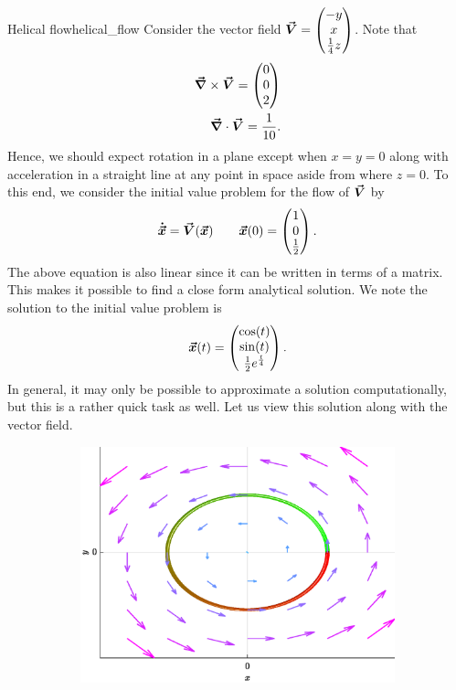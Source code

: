         \begin{ex}{Helical flow}{helical_flow}
        Consider the vector field $\boldsymbol{\vec{V}}=\begin{pmatrix} -y \\ x \\ \frac{1}{4}z \end{pmatrix}$. Note that
    \begin{align}
    \boldsymbol{\vec{\nabla}} \times \boldsymbol{\vec{V}} = \begin{pmatrix} 0 \\ 0 \\ 2 \end{pmatrix}\\
    \boldsymbol{\vec{\nabla}} \cdot \boldsymbol{\vec{V}} = \frac{1}{10}.
    \end{align}
    Hence, we should expect rotation in a plane except when $x=y=0$ along with acceleration in a straight line at any point in space aside from where $z=0$. To this end, we consider the initial value problem for the flow of $\boldsymbol{\vec{V}}$ by
    \begin{equation}
    \boldsymbol{\dot{\vec{x}}} = \boldsymbol{\vec{V}}(\boldsymbol{\vec{x}}) \qquad \boldsymbol{\vec{x}}(0)=\begin{pmatrix} 1 \\ 0 \\ \frac{1}{2} \end{pmatrix}.
    \end{equation}
    The above equation is also linear since it can be written in terms of a matrix. This makes it possible to find a close form analytical solution. We note the solution to the initial value problem is
    \begin{equation}
    \boldsymbol{\vec{x}}(t) = \begin{pmatrix} \cos(t) \\ \sin(t) \\ \frac{1}{2}e^{\frac{t}{4}} \end{pmatrix}.
    \end{equation}
    In general, it may only be possible to approximate a solution computationally, but this is a rather quick task as well. Let us view this solution along with the vector field.
    \begin{figure}[H]
     \centering
     \begin{subfigure}[b]{0.3\textwidth}
         \centering
         \includegraphics[width=\textwidth]{Figures_Part_6/flow_xy}

\end{subfigure}
\end{figure}
\end{ex}
